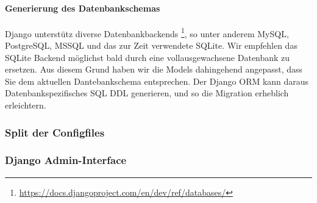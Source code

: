 \paragraph{Generierung des Datenbankschemas}
Django unterstütz diverse Datenbankbackends \footnote{\url{https://docs.djangoproject.com/en/dev/ref/databases/}}, so unter anderem MySQL, PostgreSQL, MSSQL und das zur Zeit verwendete SQLite.
Wir empfehlen das SQLite Backend möglichst bald durch eine vollausgewachsene Datenbank zu ersetzen. Aus diesem Grund haben wir die Models dahingehend angepasst, dass Sie dem aktuellen Dantebankschema entsprechen. 
Der Django ORM kann daraus Datenbankspezifisches SQL DDL generieren, und so die Migration erheblich erleichtern.

\subsubsection{Split der Configfiles}

\subsubsection{Django Admin-Interface}
